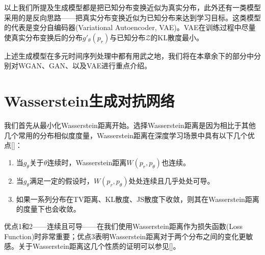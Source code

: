 以上我们所提及生成模型都是把已知分布变换近似为真实分布，此外还有一类模型采用的是反向思路——把真实分布变换近似为已知分布来达到学习目标。这类模型的代表是变分自编码器(Variational Autoencoder, VAE)。VAE在训练过程中尽量使真实分布变换后的分布$g'_{\theta}(p_{r})$与已知分布$\mathcal{Z}$的KL散度最小。

上述生成模型在多元时间序列处理中都有用武之地，我们将在本章余下的部分中分别对WGAN、GAN、以及VAE进行重点介绍。

\section{Wasserstein生成对抗网络}
我们首先从最小化Wasserstein距离开始。选择Wasserstein距离是因为相比于其他几个常用的分布相似度度量，Wasserstein距离在深度学习场景中具有以下几个优点[\cite{pmlr-v70-arjovsky17a}]：
\begin{enumerate}
	\setlength{\itemsep}{0pt}
    \setlength{\parsep}{0pt}
    \setlength{\parskip}{0pt}
	\item 当$g_{\theta}$关于$\theta$连续时，Wasserstein距离$W(p_{r},p_{\theta})$也连续。
	\item 当$g_{\theta}$满足一定的假设时，$W(p_{r},p_{\theta})$处处连续且几乎处处可导。
	\item 如果一系列分布在TV距离、KL散度、JS散度下收敛，则其在Wasserstein距离的度量下也会收敛。
\end{enumerate}
优点1和2——连续且可导——在我们使用Wasserstein距离作为损失函数(Loss Function)时非常重要；优点3表明Wasserstein距离对于两个分布之间的变化更敏感。关于Wasserstein距离这几个性质的证明可以参见[\cite{pmlr-v70-arjovsky17a}]。

